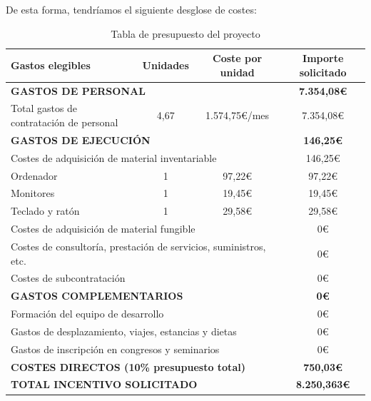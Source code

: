 De esta forma, tendríamos el siguiente desglose de costes:
\begin{table}[H]
    \begin{center}
        \begin{tabularx}{\textwidth}{|X|c|c|c|}
            \hline
            \textbf{Gastos elegibles} & \textbf{Unidades} & \textbf{Coste por unidad} & \textbf{Importe solicitado} \\
            \hline
            \multicolumn{3}{|l|}{\textbf{GASTOS DE PERSONAL}} & \textbf{7.354,08\euro} \\
            Total gastos de contratación de personal & 4,67 & 1.574,75\euro/mes & 7.354,08\euro \\
            \hline
            \multicolumn{3}{|l|}{\textbf{GASTOS DE EJECUCIÓN}} & \textbf{146,25\euro} \\
            \multicolumn{3}{|l|}{Costes de adquisición de material inventariable} & 146,25\euro \\
            \quad Ordenador & 1 & 97,22\euro & 97,22\euro \\
            \quad Monitores & 1 & 19,45\euro & 19,45\euro \\
            \quad Teclado y ratón & 1 & 29,58\euro & 29,58\euro \\
            \multicolumn{3}{|l|}{Costes de adquisición de material fungible} & 0\euro \\
            \multicolumn{3}{|l|}{Costes de consultoría, prestación de servicios, suministros, etc.} & 0\euro \\
            \multicolumn{3}{|l|}{Costes de subcontratación} & 0\euro \\
            \multicolumn{3}{|l|}{\textbf{GASTOS COMPLEMENTARIOS}} & \textbf{0\euro} \\
            \multicolumn{3}{|l|}{Formación del equipo de desarrollo} & 0\euro \\
            \multicolumn{3}{|l|}{Gastos de desplazamiento, viajes, estancias y dietas} & 0\euro \\
            \multicolumn{3}{|l|}{Gastos de inscripción en congresos y seminarios} & 0\euro \\
            \hline
            \multicolumn{3}{|l|}{\textbf{COSTES DIRECTOS (10\% presupuesto total)}} & \textbf{750,03\euro} \\
            \hline
            \multicolumn{3}{|l|}{\textbf{TOTAL INCENTIVO SOLICITADO}} & \textbf{8.250,363\euro} \\
            \hline
        \end{tabularx}
    \end{center}
    \caption{Tabla de presupuesto del proyecto}\label{tab:presupuesto}
\end{table}



